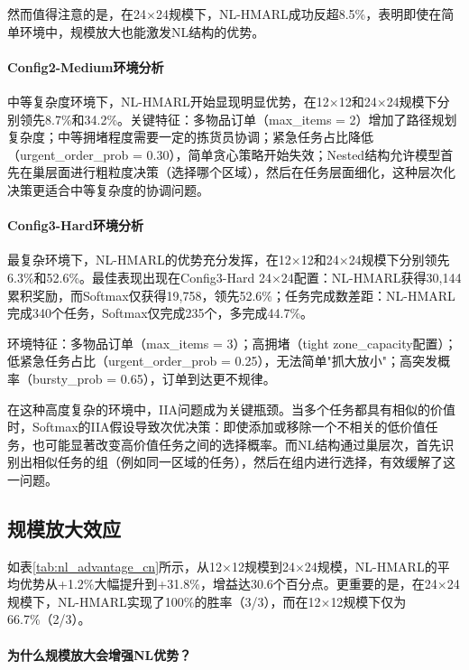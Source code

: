 \documentclass[12pt,a4paper]{article}
\begin{document}
然而值得注意的是，在24$\times$24规模下，NL-HMARL成功反超8.5\%，表明即使在简单环境中，规模放大也能激发NL结构的优势。

\paragraph{Config2-Medium环境分析}

中等复杂度环境下，NL-HMARL开始显现明显优势，在12$\times$12和24$\times$24规模下分别领先8.7\%和34.2\%。关键特征：多物品订单（max\_items = 2）增加了路径规划复杂度；中等拥堵程度需要一定的拣货员协调；紧急任务占比降低（urgent\_order\_prob = 0.30），简单贪心策略开始失效；Nested结构允许模型首先在巢层面进行粗粒度决策（选择哪个区域），然后在任务层面细化，这种层次化决策更适合中等复杂度的协调问题。

\paragraph{Config3-Hard环境分析}

最复杂环境下，NL-HMARL的优势充分发挥，在12$\times$12和24$\times$24规模下分别领先6.3\%和52.6\%。最佳表现出现在Config3-Hard 24$\times$24配置：NL-HMARL获得30,144累积奖励，而Softmax仅获得19,758，领先52.6\%；任务完成数差距：NL-HMARL完成340个任务，Softmax仅完成235个，多完成44.7\%。

环境特征：多物品订单（max\_items = 3）；高拥堵（tight zone\_capacity配置）；低紧急任务占比（urgent\_order\_prob = 0.25），无法简单"抓大放小"；高突发概率（bursty\_prob = 0.65），订单到达更不规律。

在这种高度复杂的环境中，IIA问题成为关键瓶颈。当多个任务都具有相似的价值时，Softmax的IIA假设导致次优决策：即使添加或移除一个不相关的低价值任务，也可能显著改变高价值任务之间的选择概率。而NL结构通过巢层次，首先识别出相似任务的组（例如同一区域的任务），然后在组内进行选择，有效缓解了这一问题。

\subsection{规模放大效应}

如表\ref{tab:nl_advantage_cn}所示，从12$\times$12规模到24$\times$24规模，NL-HMARL的平均优势从+1.2\%大幅提升到+31.8\%，增益达30.6个百分点。更重要的是，在24$\times$24规模下，NL-HMARL实现了100\%的胜率（3/3），而在12$\times$12规模下仅为66.7\%（2/3）。

\paragraph{为什么规模放大会增强NL优势？}
\end{document}
